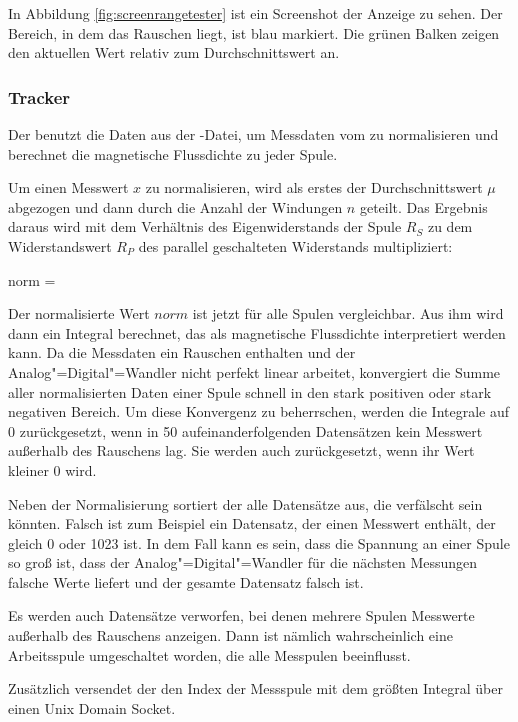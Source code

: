 In Abbildung \ref{fig:screenrangetester} ist ein Screenshot der Anzeige zu sehen.
Der Bereich, in dem das Rauschen liegt, ist blau markiert.
Die grünen Balken zeigen den aktuellen Wert relativ zum Durchschnittswert an.

\subsubsection{Tracker}
Der  benutzt die Daten aus der -Datei, um Messdaten vom  zu normalisieren und berechnet die magnetische Flussdichte zu jeder Spule.

Um einen Messwert $x$ zu normalisieren, wird als erstes der Durchschnittswert $\mu$ abgezogen und dann durch die Anzahl der Windungen $n$ geteilt.
Das Ergebnis daraus wird mit dem Verhältnis des Eigenwiderstands der Spule $R_S$ zu dem Widerstandswert $R_P$ des parallel geschalteten Widerstands multipliziert:

\mathematik
norm =  \cdot {}
\mathematikstop

Der normalisierte Wert $norm$ ist jetzt für alle Spulen vergleichbar.
Aus ihm wird dann ein Integral berechnet, das als magnetische Flussdichte interpretiert werden kann.
Da die Messdaten ein Rauschen enthalten und der Analog"=Digital"=Wandler nicht perfekt linear arbeitet, konvergiert die Summe aller normalisierten Daten einer Spule schnell in den stark positiven oder stark negativen Bereich.
Um diese Konvergenz zu beherrschen, werden die Integrale auf 0 zurückgesetzt, wenn in 50  aufeinanderfolgenden Datensätzen kein Messwert außerhalb des Rauschens lag.
Sie werden auch zurückgesetzt, wenn ihr Wert kleiner 0 wird.

Neben der Normalisierung sortiert der  alle Datensätze aus, die verfälscht sein könnten.
Falsch ist zum Beispiel ein Datensatz, der einen Messwert enthält, der gleich 0 oder 1023 ist. In dem Fall kann es sein, dass die Spannung an einer Spule so groß ist, dass der Analog"=Digital"=Wandler für die nächsten Messungen falsche Werte liefert und der gesamte Datensatz falsch ist.

Es werden auch Datensätze verworfen, bei denen mehrere Spulen Messwerte außerhalb des Rauschens anzeigen.
Dann ist nämlich wahrscheinlich eine Arbeitsspule umgeschaltet worden, die alle Messpulen beeinflusst.

Zusätzlich versendet der  den Index der Messspule mit dem größten Integral über einen Unix Domain Socket.

